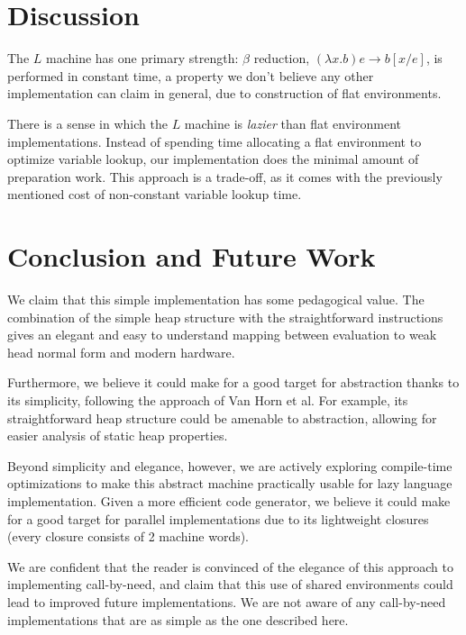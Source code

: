 \documentclass[preprint]{sigplanconf}
\begin{document}


\section{Discussion}
The $L$ machine has one primary strength: $\beta$ reduction, $(\lambda x.b) e
\rightarrow b[x/e]$, is performed in constant time, a property we don't believe
any other implementation can claim in general, due to construction of flat
environments.

There is a sense in which the $L$ machine is \emph{lazier} than flat environment
implementations. Instead of spending time allocating a flat environment to
optimize variable lookup, our implementation does the minimal amount of
preparation work. This approach is a trade-off, as it comes with the previously
mentioned cost of non-constant variable lookup time. 

\section{Conclusion and Future Work}
We claim that this simple implementation has some pedagogical value. The
combination of the simple heap structure with the straightforward instructions
gives an elegant and easy to understand mapping between evaluation to weak head
normal form and modern hardware.

Furthermore, we believe it could make for a good target for abstraction thanks
to its simplicity, following the approach of Van Horn et
al\cite{van2010abstracting}. For example, its straightforward heap structure
could be amenable to abstraction, allowing for easier analysis of static heap
properties.

Beyond simplicity and elegance, however, we are actively exploring compile-time
optimizations to make this abstract machine practically usable for lazy language
implementation. Given a more efficient code generator, we believe it could make
for a good target for parallel implementations due to its lightweight closures
(every closure consists of 2 machine words).

We are confident that the reader is convinced of the elegance of this approach
to implementing call-by-need, and claim that this use of shared environments
could lead to improved future implementations. We are not aware of any
call-by-need implementations that are as simple as the one described here.




\end{document}
